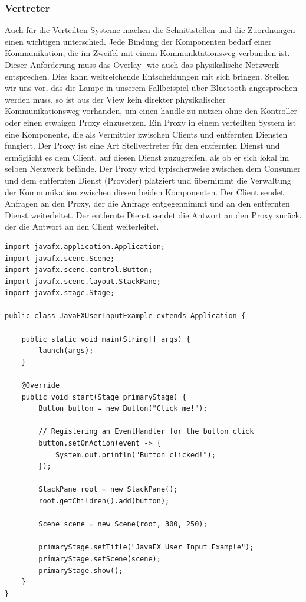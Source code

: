 \subsubsection{Vertreter}
Auch für die Verteilten Systeme machen die Schnittstellen und die Zuordnungen einen wichtigen unterschied. Jede Bindung der Komponenten bedarf einer Kommunikation, die im Zweifel mit einem Kommunktationsweg verbunden ist. Dieser Anforderung muss das Overlay- wie auch das physikalische Netzwerk entsprechen. Dies kann weitreichende Entscheidungen mit sich bringen. Stellen wir uns vor, das die Lampe in unserem Fallbeispiel über Bluetooth angesprochen werden muss, so ist aus der View kein direkter physikalischer Kommunikationsweg vorhanden, um einen handle zu nutzen ohne den Kontroller oder einen etwaigen Proxy einzusetzen.  Ein Proxy in einem verteilten System ist eine Komponente, die als Vermittler zwischen Clients und entfernten Diensten fungiert. Der Proxy ist eine Art Stellvertreter für den entfernten Dienst und ermöglicht es dem Client, auf diesen Dienst zuzugreifen, als ob er sich lokal im selben Netzwerk befände.
Der Proxy wird typischerweise zwischen dem Consumer und dem entfernten Dienst (Provider) platziert und übernimmt die Verwaltung der Kommunikation zwischen diesen beiden Komponenten. Der Client sendet Anfragen an den Proxy, der die Anfrage entgegennimmt und an den entfernten Dienst weiterleitet. Der entfernte Dienst sendet die Antwort an den Proxy zurück, der die Antwort an den Client weiterleitet.

\noindent\begin{minipage}{\textwidth}
\begin{lstlisting}[caption={Java FX Input},captionpos=b,label={lst:javafx-input}]
import javafx.application.Application;
import javafx.scene.Scene;
import javafx.scene.control.Button;
import javafx.scene.layout.StackPane;
import javafx.stage.Stage;

public class JavaFXUserInputExample extends Application {

    public static void main(String[] args) {
        launch(args);
    }

    @Override
    public void start(Stage primaryStage) {
        Button button = new Button("Click me!");

        // Registering an EventHandler for the button click
        button.setOnAction(event -> {
            System.out.println("Button clicked!");
        });

        StackPane root = new StackPane();
        root.getChildren().add(button);

        Scene scene = new Scene(root, 300, 250);

        primaryStage.setTitle("JavaFX User Input Example");
        primaryStage.setScene(scene);
        primaryStage.show();
    }
}
\end{lstlisting}
\end{minipage}

